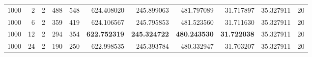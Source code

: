\begin{table}
\begin{tabular}{rrrrrrrrrrr}
1000 & 2 & 2 & 488 & 548 & 624.408020 & 245.899063 & 481.797089 & 31.717897 & 35.327911 & 20 \\
1000 & 6 & 2 & 359 & 419 & 624.106567 & 245.795853 & 481.523560 & 31.711630 & 35.327911 & 20 \\
1000 & 12 & 2 & 294 & 354 & \textbf{622.752319} & \textbf{245.324722} & \textbf{480.243530} & \textbf{31.722038} & 35.327911 & 20 \\
1000 & 24 & 2 & 190 & 250 & 622.998535 & 245.393784 & 480.332947 & 31.703207 & 35.327911 & 20 \\
\bottomrule
\end{tabular}
\end{table}

